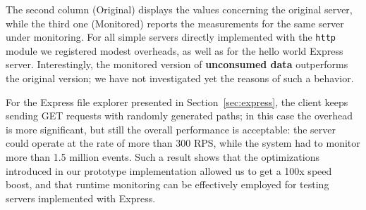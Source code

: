 The second column (Original) displays the values concerning the original server, while the third one
(Monitored) reports the measurements for the same server under monitoring.
For all simple servers directly implemented with the \lstinline{http} module we registered modest overheads, as well
as for the hello world Express server.
Interestingly, the monitored version of \textbf{unconsumed data} outperforms the original version; we have
not investigated yet the reasons of such a behavior.

For the Express file explorer presented in Section~\ref{sec:express}, the client keeps sending GET requests
with randomly generated paths; in this case the overhead is more significant, but still the overall performance 
is acceptable: the server could operate at the rate of more than 300 RPS, while the system had to monitor more than 1.5 million events.
Such a result shows that the optimizations introduced in our prototype implementation allowed us
to get a 100x speed boost, and that runtime monitoring can be effectively employed for testing servers implemented with Express.
